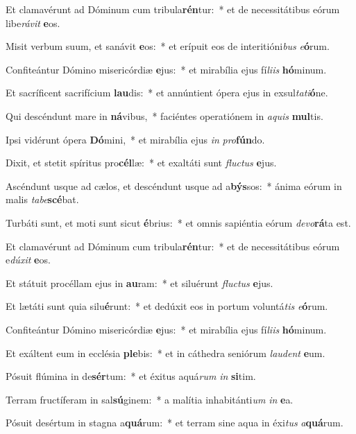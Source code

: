 \item Et clamavérunt ad Dóminum cum tribula\textbf{rén}tur:~* et de necessitátibus eórum libe\textit{rá}\textit{vit} \textbf{e}os.
\item Misit verbum suum, et sanávit \textbf{e}os:~* et erípuit eos de interitióni\textit{bus} \textit{e}\textbf{ó}rum.
\item Confiteántur Dómino misericórdiæ \textbf{e}jus:~* et mirabília ejus fí\textit{li}\textit{is} \textbf{hó}minum.
\item Et sacríficent sacrifícium \textbf{lau}dis:~* et annúntient ópera ejus in exsul\textit{ta}\textit{ti}\textbf{ó}ne.
\item Qui descéndunt mare in \textbf{ná}vibus,~* faciéntes operatiónem in \textit{a}\textit{quis} \textbf{mul}tis.
\item Ipsi vidérunt ópera \textbf{Dó}mini,~* et mirabília ejus \textit{in} \textit{pro}\textbf{fún}do.
\item Dixit, et stetit spíritus pro\textbf{cél}læ:~* et exaltáti sunt \textit{fluc}\textit{tus} \textbf{e}jus.
\item Ascéndunt usque ad cælos, et descéndunt usque ad a\textbf{býs}sos:~* ánima eórum in malis \textit{ta}\textit{be}\textbf{scé}bat.
\item Turbáti sunt, et moti sunt sicut \textbf{é}brius:~* et omnis sapiéntia eórum \textit{de}\textit{vo}\textbf{rá}ta est.
\item Et clamavérunt ad Dóminum cum tribula\textbf{rén}tur:~* et de necessitátibus eórum e\textit{dú}\textit{xit} \textbf{e}os.
\item Et státuit procéllam ejus in \textbf{au}ram:~* et siluérunt \textit{fluc}\textit{tus} \textbf{e}jus.
\item Et lætáti sunt quia silu\textbf{é}runt:~* et dedúxit eos in portum voluntá\textit{tis} \textit{e}\textbf{ó}rum.
\item Confiteántur Dómino misericórdiæ \textbf{e}jus:~* et mirabília ejus fí\textit{li}\textit{is} \textbf{hó}minum.
\item Et exáltent eum in ecclésia \textbf{ple}bis:~* et in cáthedra seniórum \textit{lau}\textit{dent} \textbf{e}um.
\item Pósuit flúmina in de\textbf{sér}tum:~* et éxitus aquá\textit{rum} \textit{in} \textbf{si}tim.
\item Terram fructíferam in sal\textbf{sú}ginem:~* a malítia inhabitánti\textit{um} \textit{in} \textbf{e}a.
\item Pósuit desértum in stagna a\textbf{quá}rum:~* et terram sine aqua in éxi\textit{tus} \textit{a}\textbf{quá}rum.
